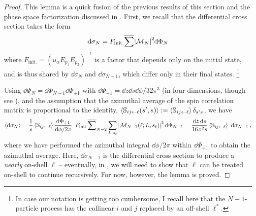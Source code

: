 \begin{proof}
    This lemma is a quick fusion of the previous results of this section and the  phase space factorization discussed in .
    First, we recall that the differential cross section takes the form
    \begin{align}
        \dd \sigma_N
        =
        F_\text{init.}
        \overline{\sum}\abs{\mathcal{M}_N}^2
        \dd \Phi_N
    \end{align}
    where \(F_\text{init.} = (u_\alpha E_{p_1} E_{p_2})^{-1}\) is a factor that depends only on the initial state, and is thus shared by \(\dd\sigma_{N}\) and \(\dd\sigma_{N-1}\), which differ only in their final states.%
    \footnote{
        In case our notation is getting too cumbersome, I recall here that the \(N-1\)-particle process has the collinear \(i\) and \(j\) replaced by an off-shell \(\ell^*\).
    }

    Using \(\dd\Phi_N = \dd\Phi_{N-1} \dd\Phi_{+1}\) with \(\dd\Phi_{+1} = \dd z \dd s \dd \phi / 32 \pi^3\) (in four dimensions, though see ), and the assumption that the azimuthal average of the spin correlation matrix is proportional to the identity, \(\left\langle \mathbb{S}_{ij\leftarrow \ell}(s',s) \right\rangle := \left\langle\mathbb{S}_{ij\leftarrow \ell}\right\rangle \delta_{s' s}\), we have
    \begin{align}
        \left\langle \dd \sigma_N\right\rangle
        =
        \frac{1}{s}
        \left\langle\mathbb{S}_{ij\leftarrow \ell}\right\rangle
        \frac{\dd\Phi_{+1}}{\dd\phi / 2\pi}
        \,\,\,
        F_{\text{init}}
        \,
        \overline{\sum}_{N-2}
        \sum_{L, s_\ell}
        \abs{\mathcal{M}_{N-1}(\ell; L, s_\ell)}^2
        \,
        \dd\Phi_{N-1}
        =
        \frac{\dd z \, \dd s}{16 \pi^2 s}
        \left\langle\mathbb{S}_{ij\leftarrow \ell}\right\rangle
        \,\,
        \dd\sigma_{N-1}
        \,,
    \end{align}
    where we have performed the azimuthal integral \(\dd\phi/2\pi\) within \(\dd\Phi_{+1}\) to obtain the azimuthal average.
    Here, \(\dd\sigma_{N-1}\) is the differential cross section to produce a \textit{nearly} on-shell \(\ell\) -- eventually, in , we will need to show that \(\ell\) can be treated on-shell to continue recursively.
    For now, however, the lemma is proved.
\end{proof}



